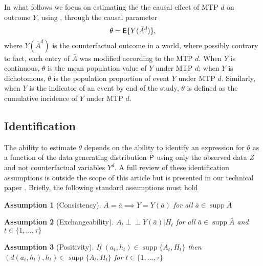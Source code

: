 \documentclass[]{jss}
\begin{document}
In what follows we focus on estimating the the causal effect of MTP \(d\) on
outcome \(Y\), using , through the causal parameter
\begin{equation}
  \theta = \mathsf{E}\{Y(\bar A^d)\}\text{,}
\end{equation}
where \(Y(\bar A^d)\) is the counterfactual outcome in a world, where
possibly contrary to fact, each entry of \(\bar{A}\) was modified
according to the MTP \(d\). When \(Y\) is continuous, \(\theta\) is
the mean population value of \(Y\) under MTP \(d\); when \(Y\) is
dichotomous, \(\theta\) is the population proportion of event \(Y\)
under MTP \(d\). Similarly, when \(Y\) is the indicator of an event by
end of the study, \(\theta\) is defined as the cumulative incidence of
\(Y\) under MTP \(d\).

\hypertarget{identification}{%
\subsection{Identification}\label{identification}}

The ability to estimate \(\theta\) depends on the ability to identify
an expression for \(\theta\) as a function of the data generating
distribution \(\mathsf{P}\) using only the observed data \(Z\) and not
counterfactual variables $Y^d$. A full review of these identification
assumptions is outside the scope of this article but is presented in
our technical paper \citep{diazNonparametricCausalEffects2020a}.
Briefly, the following standard assumptions must hold

\newtheorem{assumption}{Assumption}

\begin{assumption}[Consistency]\label{ass:cons}
\(\bar{A} = \bar{a} \implies Y = Y(\bar{a})\) for all $\bar{a} \in \mathop{\mathrm{supp}}\bar{A}$ 
\end{assumption}
\begin{assumption}[Exchangeability]\label{ass:ex}
  $A_t \perp \!\!\! \perp Y(\bar{a}) | H_t$ for all
  $\bar{a} \in \mathop{\mathrm{supp}}\bar{A}$ and
  $t \in \{1, ..., \tau\}$
\end{assumption}
\begin{assumption}[Positivity]\label{ass:pos}
  If $(a_t, h_t) \in \mathop{\mathrm{supp}}\{A_t, H_t\}$ then
  $(d(a_t, h_t), h_t) \in \mathop{\mathrm{supp}}\{A_t, H_t\}$ for
  $t \in \{1, ..., \tau \}$
\end{assumption}
\end{document}
